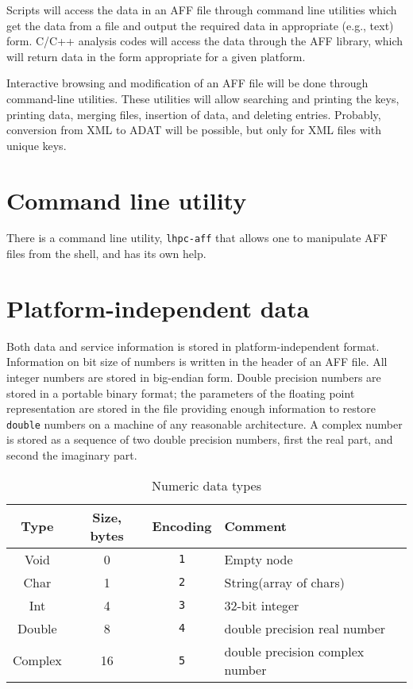 \documentclass[10pt,letterpaper]{article}
\newcommand{\bc}{\begin{center}}
\newcommand{\ec}{\end{center}}
\newcommand{\ctext}[1]{\texttt{#1}}         %
\newcommand{\libname}[1]{\ctext{#1}\index{\ctext{#1}}} %
\newcommand{\ctype}[1]{\ctext{#1}}          %
\begin{document}
Scripts will access the data in an AFF file through command line utilities which get the
data from a file and output the required data in appropriate (e.g., text) form. C/C++ analysis
codes will access the data through the AFF library, which will return data in the form
appropriate for a given platform.

Interactive browsing and modification of an AFF file will be done through command-line utilities. 
These utilities will allow searching and printing the keys, printing data, merging files,
insertion of data, and deleting entries. Probably, conversion from XML to ADAT will be possible,
but only for XML files with unique keys.

\section{Command line utility}
There is a command line utility, \libname{lhpc-aff} that allows one to manipulate AFF files from the shell,
and has its own help.

\section{Platform-independent data}
Both data and service information is stored in platform-independent format. 
Information on bit size of numbers is written in the header of an AFF file.
All integer numbers are stored in big-endian form. 
Double precision numbers are stored in a portable binary format; the parameters of the floating
point representation are stored in the file providing enough information to restore \ctype{double}
numbers on a machine of any reasonable architecture. 
A complex number is stored as a sequence of two double precision numbers, first the real part,
and second the imaginary part.

\begin{table}[ht]
\bc
\caption{Numeric data types}\label{tab:types}
\begin{tabular}{|c|c|c|l|} \hline
Type & Size, bytes & Encoding & Comment \\ \hline
Void & 0 & \ctext{1}& Empty node \\
Char & 1 & \ctext{2}& String(array of chars) \\
Int   & 4 & \ctext{3}& 32-bit integer \\
Double & 8 & \ctext{4}& double precision real number \\
Complex & 16 & \ctext{5}& double precision complex number \\ \hline
\end{tabular}
\ec
\end{table}
\end{document}
